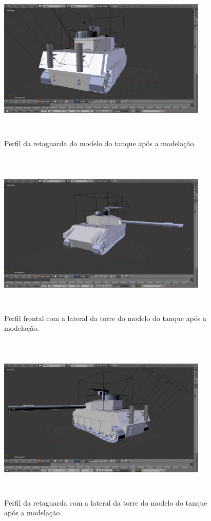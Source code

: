 \begin{figure}[!h]
  \includegraphics[width=10cm, height=8cm]{p3.png}
  \centering
  \caption{Perfil da retaguarda do modelo do tanque após a modelação.}
  \label{fig:tanque3}
\end{figure}

\begin{figure}[!h]
  \includegraphics[width=10cm, height=8cm]{p4.png}
  \centering
  \caption{Perfil frontal com a lateral da torre do modelo do tanque após a modelação.}
  \label{fig:tanque4}
\end{figure}

\begin{figure}[!h]
  \includegraphics[width=10cm, height=8cm]{p5.png}
  \centering
  \caption{Perfil da retaguarda com a lateral da torre do modelo do tanque após a modelação.}
  \label{fig:tanque5}
\end{figure}

